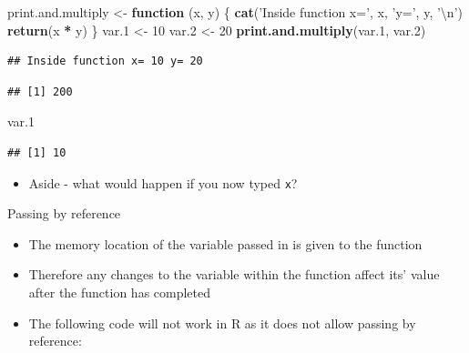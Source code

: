 \documentclass[ignorenonframetext,]{beamer}
\newenvironment{Shaded}{\begin{snugshade}}{\end{snugshade}}
\newcommand{\KeywordTok}[1]{\textcolor[rgb]{0.13,0.29,0.53}{\textbf{#1}}}
\newcommand{\DecValTok}[1]{\textcolor[rgb]{0.00,0.00,0.81}{#1}}
\newcommand{\CharTok}[1]{\textcolor[rgb]{0.31,0.60,0.02}{#1}}
\newcommand{\StringTok}[1]{\textcolor[rgb]{0.31,0.60,0.02}{#1}}
\newcommand{\ControlFlowTok}[1]{\textcolor[rgb]{0.13,0.29,0.53}{\textbf{#1}}}
\newcommand{\OperatorTok}[1]{\textcolor[rgb]{0.81,0.36,0.00}{\textbf{#1}}}
\newcommand{\NormalTok}[1]{#1}
\providecommand{\tightlist}{%
  \setlength{\itemsep}{0pt}\setlength{\parskip}{0pt}}
\begin{document}
\begin{frame}[fragile]

\begin{Shaded}
\begin{Highlighting}[]
\NormalTok{print.and.multiply <-}\StringTok{ }\ControlFlowTok{function}\NormalTok{ (x, y) \{}
    \KeywordTok{cat}\NormalTok{(}\StringTok{'Inside function x='}\NormalTok{, x, }\StringTok{'y='}\NormalTok{, y, }\StringTok{'}\CharTok{\textbackslash{}n}\StringTok{'}\NormalTok{)}
    \KeywordTok{return}\NormalTok{(x }\OperatorTok{*}\StringTok{ }\NormalTok{y)}
\NormalTok{\}}
\NormalTok{var.}\DecValTok{1}\NormalTok{ <-}\StringTok{ }\DecValTok{10}
\NormalTok{var.}\DecValTok{2}\NormalTok{ <-}\StringTok{ }\DecValTok{20}
\KeywordTok{print.and.multiply}\NormalTok{(var.}\DecValTok{1}\NormalTok{, var.}\DecValTok{2}\NormalTok{)}
\end{Highlighting}
\end{Shaded}

\begin{verbatim}
## Inside function x= 10 y= 20
\end{verbatim}

\begin{verbatim}
## [1] 200
\end{verbatim}

\begin{Shaded}
\begin{Highlighting}[]
\NormalTok{var.}\DecValTok{1}
\end{Highlighting}
\end{Shaded}

\begin{verbatim}
## [1] 10
\end{verbatim}

\begin{itemize}[<+->]
\tightlist
\item
  Aside - what would happen if you now typed \texttt{x}?
\end{itemize}

\end{frame}

\begin{frame}{Passing by reference}

\begin{itemize}[<+->]
\tightlist
\item
  The memory location of the variable passed in is given to the function
\item
  Therefore any changes to the variable within the function affect its'
  value after the function has completed
\item
  The following code will not work in R as it does not allow passing by
  reference:
\end{itemize}

\end{frame}
\end{document}

